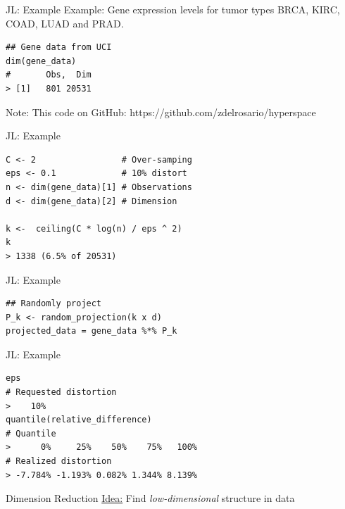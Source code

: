 \documentclass[14pt]{beamer}
\begin{document}
\begin{frame}[fragile]{JL: Example}
Example: Gene expression levels for tumor types BRCA, KIRC, COAD, LUAD and PRAD.

\bigskip
  \begin{lstlisting}
## Gene data from UCI
dim(gene_data)
#       Obs,  Dim
> [1]   801 20531
  \end{lstlisting}

  \bigskip
  Note: This code on GitHub: https://github.com/zdelrosario/hyperspace
\end{frame}

\begin{frame}[fragile]{JL: Example}
  \begin{lstlisting}
C <- 2                 # Over-samping
eps <- 0.1             # 10% distort
n <- dim(gene_data)[1] # Observations
d <- dim(gene_data)[2] # Dimension

k <-  ceiling(C * log(n) / eps ^ 2)
k
> 1338 (6.5% of 20531)
  \end{lstlisting}
\end{frame}

\begin{frame}[fragile]{JL: Example}
  \begin{lstlisting}
## Randomly project
P_k <- random_projection(k x d)
projected_data = gene_data %*% P_k
  \end{lstlisting}
\end{frame}

\begin{frame}[fragile]{JL: Example}
  \begin{lstlisting}
eps
# Requested distortion
>    10%
quantile(relative_difference)
# Quantile
>      0%     25%    50%    75%   100%
# Realized distortion
> -7.784% -1.193% 0.082% 1.344% 8.139%
  \end{lstlisting}
\end{frame}


\begin{frame}{Dimension Reduction}
  \huge\underline{Idea:} Find \emph{low-dimensional} structure in data
\end{frame}
\end{document}
